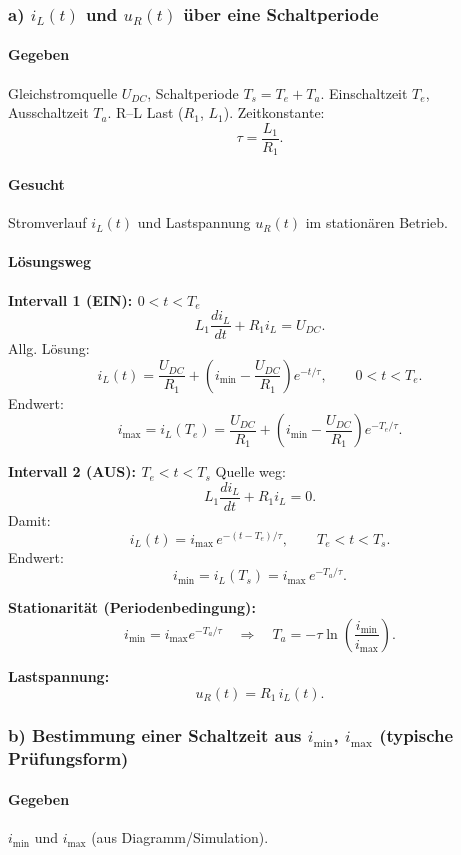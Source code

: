 \subsubsection*{a) $i_L(t)$ und $u_R(t)$ über eine Schaltperiode}

\paragraph{Gegeben}
Gleichstromquelle $U_{DC}$, Schaltperiode $T_s=T_e+T_a$.
Einschaltzeit $T_e$, Ausschaltzeit $T_a$.
R--L Last ($R_1$, $L_1$). Zeitkonstante:
\[
\boxed{\tau=\frac{L_1}{R_1}}.
\]

\paragraph{Gesucht}
Stromverlauf $i_L(t)$ und Lastspannung $u_R(t)$ im stationären Betrieb.

\paragraph{Lösungsweg}
\textbf{Intervall 1 (EIN): $0<t<T_e$}
\[
L_1\frac{di_L}{dt}+R_1 i_L = U_{DC}.
\]
Allg. Lösung:
\[
\boxed{
i_L(t)=\frac{U_{DC}}{R_1}+\left(i_{\min}-\frac{U_{DC}}{R_1}\right)e^{-t/\tau}
},\qquad 0<t<T_e.
\]
Endwert:
\[
\boxed{
i_{\max}=i_L(T_e)=\frac{U_{DC}}{R_1}+\left(i_{\min}-\frac{U_{DC}}{R_1}\right)e^{-T_e/\tau}.
}
\]

\textbf{Intervall 2 (AUS): $T_e<t<T_s$}
Quelle weg:
\[
L_1\frac{di_L}{dt}+R_1 i_L = 0.
\]
Damit:
\[
\boxed{
i_L(t)= i_{\max}\,e^{-(t-T_e)/\tau}
},\qquad T_e<t<T_s.
\]
Endwert:
\[
\boxed{
i_{\min}=i_L(T_s)=i_{\max}\,e^{-T_a/\tau}.
}
\]

\textbf{Stationarität (Periodenbedingung):}
\[
i_{\min}=i_{\max}e^{-T_a/\tau}
\quad\Rightarrow\quad
\boxed{T_a=-\tau\ln\!\left(\frac{i_{\min}}{i_{\max}}\right)}.
\]

\textbf{Lastspannung:}
\[
\boxed{u_R(t)=R_1\, i_L(t)}.
\]


\subsubsection*{b) Bestimmung einer Schaltzeit aus $i_{\min}$, $i_{\max}$ (typische Prüfungsform)}

\paragraph{Gegeben}
$i_{\min}$ und $i_{\max}$ (aus Diagramm/Simulation).

